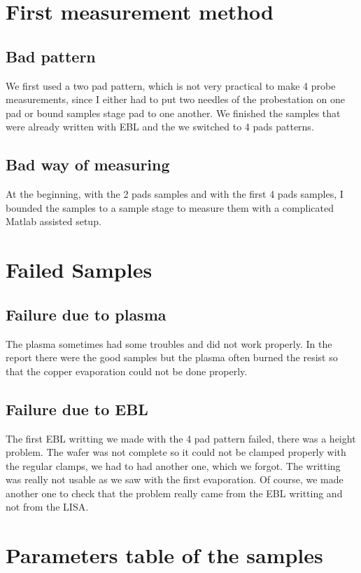 \chapter{First measurement method}

\section{Bad pattern}
\label{badtests}

We first used a two pad pattern, which is not very practical to make 4 probe measurements, since I either had to put two needles of the probestation on one pad or bound samples stage pad to one another. We finished the samples that were already written with EBL and the we switched to 4 pads patterns.


\section{Bad way of measuring}
\label{badmeasures}
At the beginning, with the 2 pads samples and with the first 4 pads samples, I bounded the samples to a sample stage to measure them with a complicated Matlab assisted setup.
\chapter{Failed Samples}
\section{Failure due to plasma}
\label{badplasma}
The plasma sometimes had some troubles and did not work properly. In the report there were the good samples but the plasma often burned the resist so that the copper evaporation could not be done properly.

\section{Failure due to EBL}
The first EBL writting we made with the 4 pad pattern failed, there was a height problem. The wafer was not complete so it could not be clamped properly with the regular clamps, we had to had another one, which we forgot. The writting was really not usable as we saw with the first evaporation. Of course, we made another one to check that the problem really came from the EBL writting and not from the LISA.
\chapter{Parameters table of the samples}
\label{parametertable}

